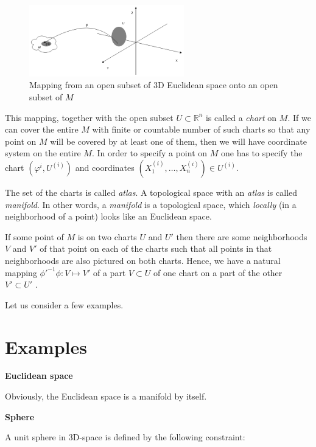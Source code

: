 \documentclass[a4paper,10pt]{article}
\begin{document}
\begin{figure}[h]
\centering
 \includegraphics[width=0.6\textwidth]{../../images/PhiMap.png}
 \caption{Mapping from an open subset of 3D Euclidean space onto an open subset of $M$}
 \label{fig:phimap}
\end{figure}

This mapping, together with the open subset $U\subset \mathbb{R}^n$ is called a {\it chart} on $M$. If we can cover the entire $M$ with finite or countable number of such charts so that any point on $M$ will be covered by at least one of them, then we will have coordinate system on the entire $M$. In order to specify a point on $M$ one has to specify the chart $(\varphi^i, U^{(i)})$ and coordinates $(X_1^{(i)}, \ldots, X_n^{(i)})\in U^{(i)}$. 

The set of the charts is called {\it atlas}. A topological space with an {\it atlas} is called {\it manifold}. 
In other words, a {\it manifold} is a topological space, which { \it locally } (in a neighborhood of a point) looks like an Euclidean space. 

If some point of $M$ is on two charts $U$ and $U'$ then there are some neighborhoods $V$ and $V'$ of that point on each of the charts such that all points in that neighborhoods are also pictured on both charts. Hence, we have a natural mapping $\phi'^{-1}\phi: V\mapsto V'$ of a part $V\subset U$ of one chart on a part of the other $V'\subset U'$ \cite{arn}.

Let us consider a few examples.

\section{Examples}


{\bf Euclidean space}
\newline

Obviously, the Euclidean space is a manifold by itself. 
\newline

{\bf Sphere}
\newline

A unit sphere in 3D-space is defined by the following constraint:
\end{document}
